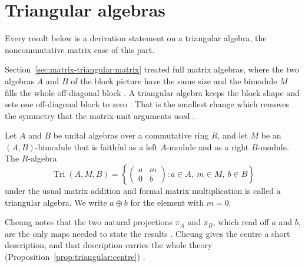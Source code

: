 \section{Triangular algebras}\label{sec:matrix-triangular:triangular}

Every result below is a derivation statement on a triangular algebra, the noncommutative matrix case of this part.

Section~\ref{sec:matrix-triangular:matrix} treated full matrix algebras, where the
two algebras $A$ and $B$ of the block picture have the same size and the bimodule
$M$ fills the whole off-diagonal block \cite[p.~119]{Cheung2001}. A triangular
algebra keeps the block shape and sets one off-diagonal block to zero
\cite[p.~119]{Cheung2001}. That is the smallest change which removes the symmetry
that the matrix-unit arguments used \cite[p.~119]{Cheung2001}.

\begin{definition}\label{def:triangular:algebra}
Let $A$ and $B$ be unital algebras over a commutative ring $R$, and let $M$ be an
$(A,B)$-bimodule that is faithful as a left $A$-module and as a right
$B$-module. The $R$-algebra
\[
\operatorname{Tri}(A,M,B)=\left\{\begin{pmatrix} a & m\\ 0 & b\end{pmatrix}:
a\in A,\ m\in M,\ b\in B\right\}
\]
under the usual matrix addition and formal matrix multiplication is called a
triangular algebra. We write $a\oplus b$ for the element with $m=0$.
\end{definition}

Cheung notes that the two natural projections $\pi_A$ and $\pi_B$, which read off
$a$ and $b$, are the only maps needed to state the results
\cite[Definition~3, p.~119]{Cheung2001}. Cheung gives the centre a short description, and
that description carries the whole theory (Proposition~\ref{prop:triangular:centre}) \cite[p.~119]{Cheung2001}.

